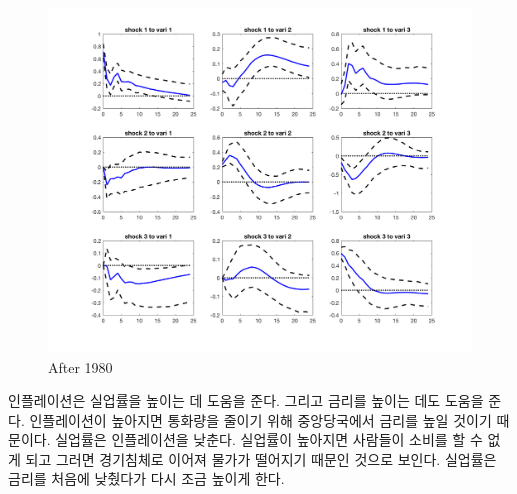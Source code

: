 \documentclass{article}
\begin{document}
  \begin{center}
  \begin{figure}
  \includegraphics[scale=0.23]{after80.png}
  \caption{After 1980}
  \end{figure}
  \end{center}
  인플레이션은 실업률을 높이는 데 도움을 준다. 그리고 금리를 높이는 데도 도움을 준다. 인플레이션이 높아지면 통화량을 줄이기 위해 중앙당국에서 금리를 높일 것이기 때문이다. 실업률은 인플레이션을 낮춘다. 실업률이 높아지면 사람들이 소비를 할 수 없게 되고 그러면 경기침체로 이어져 물가가 떨어지기 때문인 것으로 보인다. 실업률은 금리를 처음에 낮췄다가 다시 조금 높이게 한다.
\end{document}

